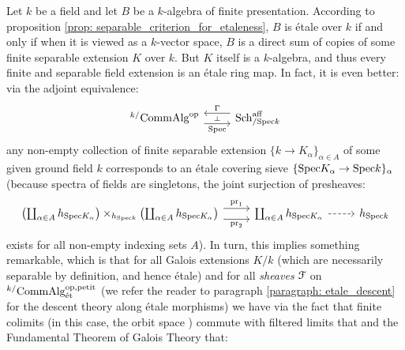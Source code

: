             \begin{corollary} \label{coro: finite_separable_extensions_are_etale}
                Let $k$ be a field and let $B$ be a $k$-algebra of finite presentation. According to proposition \ref{prop: separable_criterion_for_etaleness}, $B$ is \'etale over $k$ if and only if when it is viewed as a $k$-vector space, $B$ is a direct sum of copies of some finite separable extension $K$ over $k$. But $K$ itself is a $k$-algebra, and thus every finite and separable field extension is an \'etale ring map. In fact, it is even better: via the adjoint equivalence:
                    $$
                        \begin{tikzcd}
                        	{{}^{k/}\Comm\Alg^{\op}} & {\Sch^{\aff}_{/\Spec k}}
                        	\arrow[""{name=0, anchor=center, inner sep=0}, "\Spec"', shift right=2, from=1-1, to=1-2]
                        	\arrow[""{name=1, anchor=center, inner sep=0}, "\Gamma"', shift right=2, from=1-2, to=1-1]
                        	\arrow["\dashv"{anchor=center, rotate=-90}, draw=none, from=1, to=0]
                        \end{tikzcd}
                    $$
                any non-empty collection of finite separable extension $\{k \to K_{\alpha}\}_{\alpha \in A}$ of some given ground field $k$ corresponds to an \'etale covering sieve $\{\mathrm{Spec} K_{\alpha} \to \mathrm{Spec} k\}_{\alpha}$ (because spectra of fields are singletons, the joint surjection of presheaves:
                    $$
                        \begin{tikzcd}
                        	{\left(\coprod_{\alpha \in A} h_{\Spec K_{\alpha}}\right) \x_{h_{\Spec k}} \left(\coprod_{\alpha \in A} h_{\Spec K_{\alpha}}\right)} & {\coprod_{\alpha \in A} h_{\Spec K_{\alpha}}} & {h_{\Spec k}}
                        	\arrow["{\pr_2}"', shift right=2, from=1-1, to=1-2]
                        	\arrow["{\pr_1}", shift left=2, from=1-1, to=1-2]
                        	\arrow[dashed, from=1-2, to=1-3]
                        \end{tikzcd}
                    $$
                exists for all non-empty indexing sets $A$). In turn, this implies something remarkable, which is that for all Galois extensions $K/k$ (which are necessarily separable by definition, and hence \'etale) and for all \textit{sheaves} $\mathcal{F}$ on ${}^{k/}\mathrm{Comm}\mathrm{Alg}^{\mathrm{op}, \mathrm{petit}}_{\mathrm{\acute{e}t}}$ (we refer the reader to paragraph \ref{paragraph: etale_descent} for the descent theory along \'etale morphisms) we have via the fact that finite colimits (in this case, the orbit space ) commute with filtered limits that and the Fundamental Theorem of Galois Theory that:

\end{corollary}
